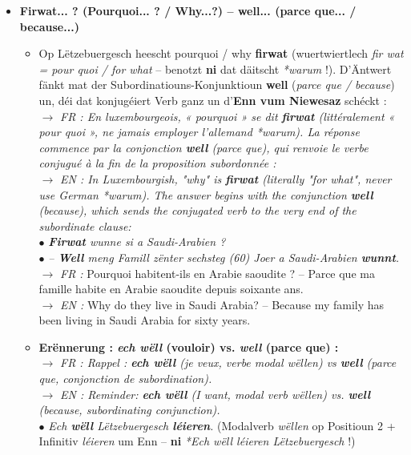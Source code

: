 \begin{itemize}
    \item \textbf{Firwat... ? (Pourquoi... ? / Why...?) -- \textbf{well}... (parce que... / because...)}
    \begin{itemize}
        \item Op Lëtzebuergesch heescht \flqq pourquoi / why\frqq{} \textbf{firwat} (wuertwiertlech \textit{\flqq fir wat\frqq{} = pour quoi / for what} -- benotzt \textbf{ni} dat däitscht \textit{*warum} !). D'Äntwert fänkt mat der Subordinatiouns-Konjunktioun \textbf{well} (\textit{parce que / because}) un, déi dat konjugéiert Verb ganz un d'\textbf{Enn vum Niewesaz} schéckt : \\
        $\rightarrow$ \textit{FR : En luxembourgeois, « pourquoi » se dit \textbf{firwat} (littéralement « pour quoi », ne jamais employer l'allemand \textit{*warum}). La réponse commence par la conjonction \textbf{well} (parce que), qui renvoie le verbe conjugué à la fin de la proposition subordonnée :} \\
        $\rightarrow$ \textit{EN : In Luxembourgish, "why" is \textbf{firwat} (literally "for what", never use German \textit{*warum}). The answer begins with the conjunction \textbf{well} (because), which sends the conjugated verb to the very end of the subordinate clause:} \\
        $\bullet$ \textit{\textbf{Firwat} wunne si a Saudi-Arabien ?} \\
        $\bullet$ \textit{-- \textbf{Well} meng Famill zënter sechsteg (60) Joer a Saudi-Arabien \textbf{wunnt}.} \\
        $\rightarrow$ \textit{FR :} Pourquoi habitent-ils en Arabie saoudite ? -- Parce que ma famille habite en Arabie saoudite depuis soixante ans. \\
        $\rightarrow$ \textit{EN :} Why do they live in Saudi Arabia? -- Because my family has been living in Saudi Arabia for sixty years.
        \item \textbf{Erënnerung : \textit{ech wëll} (vouloir) vs. \textit{well} (parce que) :} \\
        $\rightarrow$ \textit{FR : Rappel : \textbf{ech wëll} (je veux, verbe modal \textit{wëllen}) vs \textbf{well} (parce que, conjonction de subordination).} \\
        $\rightarrow$ \textit{EN : Reminder: \textbf{ech wëll} (I want, modal verb \textit{wëllen}) vs. \textbf{well} (because, subordinating conjunction).} \\
        $\bullet$ \textit{Ech \textbf{wëll} Lëtzebuergesch \textbf{léieren}.} (Modalverb \textit{wëllen} op Positioun 2 + Infinitiv \textit{léieren} um Enn -- \textbf{ni} \textit{*Ech wëll léieren Lëtzebuergesch} !) \\

\end{itemize}
\end{itemize}
